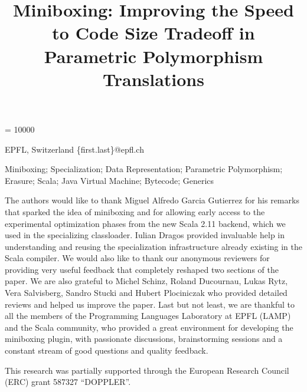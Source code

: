 \documentclass[10pt, preprint]{sigplanconf}
\begin{document}
\widowpenalty = 10000

\exclusivelicense
{}


\title{Miniboxing: Improving the Speed to Code Size Tradeoff in Parametric Polymorphism Translations}

           {EPFL, Switzerland}
           {\{first.last\}@epfl.ch}

\maketitle




\keywords
Miniboxing; Specialization; Data Representation; Parametric Polymorphism; Erasure; Scala; Java Virtual Machine; Bytecode; Generics











\acks
The authors would like to thank Miguel Alfredo Garcia Gutierrez for his remarks that sparked the idea of miniboxing and for allowing early access to the experimental optimization phases from the new Scala 2.11 backend, which we used in the specializing classloader. Iulian Dragos provided invaluable help in understanding and reusing the specialization infrastructure already existing in the Scala compiler. We would also like to thank our anonymous reviewers for providing very useful feedback that completely reshaped two sections of the paper. We are also grateful to Michel Schinz, Roland Ducournau, Lukas Rytz, Vera Salvisberg, Sandro Stucki and Hubert Plociniczak who provided detailed reviews and helped us improve the paper. Last but not least, we are thankful to all the members of the Programming Languages Laboratory at EPFL (LAMP) and the Scala community, who provided a great environment for developing the miniboxing plugin, with passionate discussions, brainstorming sessions and a constant stream of good questions and quality feedback.


This research was partially supported through the European Research Council (ERC) grant 587327 ``DOPPLER''.



\end{document}
